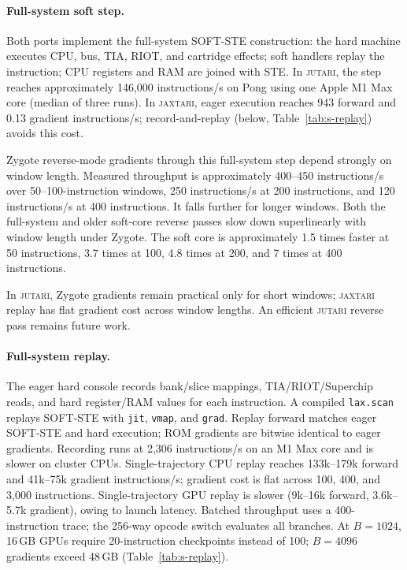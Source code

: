 \documentclass[letterpaper]{article} %
\begin{document}
\paragraph{Full-system soft step.}
Both ports implement the full-system SOFT-STE
construction: the hard machine executes CPU,
bus, TIA, RIOT, and cartridge effects; soft
handlers replay the instruction; CPU registers
and RAM are joined with STE. In \textsc{jutari},
the step reaches approximately 146,000
instructions/s on Pong using one Apple M1 Max
core (median of three runs). In \textsc{jaxtari}, eager execution reaches 943 forward
and 0.13 gradient instructions/s; record-and-replay
(below, Table~\ref{tab:s-replay}) avoids this cost.

Zygote reverse-mode gradients through this
full-system step depend strongly on window length.
Measured throughput is approximately
400--450 instructions/s over 50--100-instruction
windows, 250 instructions/s at 200 instructions,
and 120 instructions/s at 400 instructions.
It falls further for longer windows.
Both the full-system and older soft-core
reverse passes slow down superlinearly with
window length under Zygote. The soft core
is approximately 1.5 times faster at 50
instructions, 3.7 times at 100, 4.8 times
at 200, and 7 times at 400 instructions.

In \textsc{jutari}, Zygote gradients remain practical
only for short windows; \textsc{jaxtari} replay has
flat gradient cost across window lengths.
An efficient \textsc{jutari} reverse pass remains future work.

\paragraph{Full-system replay.}
The eager hard console records bank/slice mappings,
TIA/RIOT/Superchip reads, and hard register/RAM values
for each instruction. A compiled \texttt{lax.scan}
replays SOFT-STE with \texttt{jit}, \texttt{vmap},
and \texttt{grad}. Replay forward matches eager SOFT-STE
and hard execution; ROM gradients are bitwise identical
to eager gradients. Recording runs at 2,306 instructions/s
on an M1 Max core and is slower on cluster CPUs.
Single-trajectory CPU replay reaches 133k--179k
forward and 41k--75k gradient instructions/s;
gradient cost is flat across 100, 400, and 3,000
instructions. Single-trajectory GPU replay is slower
(9k--16k forward, 3.6k--5.7k gradient), owing to
launch latency. Batched throughput uses a 400-instruction
trace; the 256-way opcode switch evaluates all branches.
At $B=1024$, 16\,GB GPUs require 20-instruction
checkpoints instead of 100; $B=4096$ gradients exceed
48\,GB (Table~\ref{tab:s-replay}).
\end{document}
